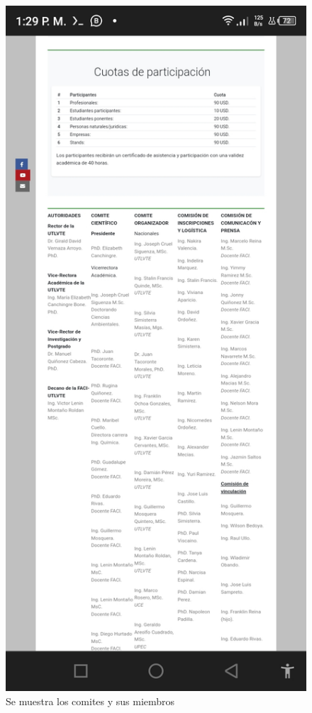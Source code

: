 \documentclass[a4paper,14px]{article}
\begin{document}
\hspace{0.5cm}
        \begin{minipage}[H]{0.45\linewidth}
\begin{figure}[H]
  \centering
  \includegraphics[scale=0.3]{index4.jpg}
  \caption{Se muestra los comites y sus miembros }
  \label{fig:arquitectura2}
\end{figure}
  
\end{minipage}
\end{document}
